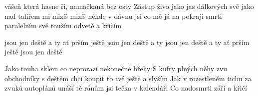 
\zs
{} vášeň která hasne ři,
namačkaná bez osty
Zástup živo jako jas dálkových svě
jako nad talířem  mi mizíš
 mizíš někde v dávnu jsi  co mě 
já na pokraji smrti  paralelním
svě toužím  odvetě a křičím
\ks
\zr

 jsou jen  deště a ty  ať prším ještě
 jsou jen  deště a ty 
 jsou jen  deště a ty  ať prším ještě
 jsou jen  deště

\kr
\zs

Jako touha sklem co neprorazí nekonečné břehy
S kufry plných něhy zvu obchodníky s deštěm
chci koupit to tvé ještě a slyším
Jak v rozestleném tichu za zvuků autoplánů
unáší tě ránům jsi tečka v kalendáři
Co nadosmrti září a křičí

\ks
\zr
\kr
\zs

  
\ks
\zr
\kr
\kp


